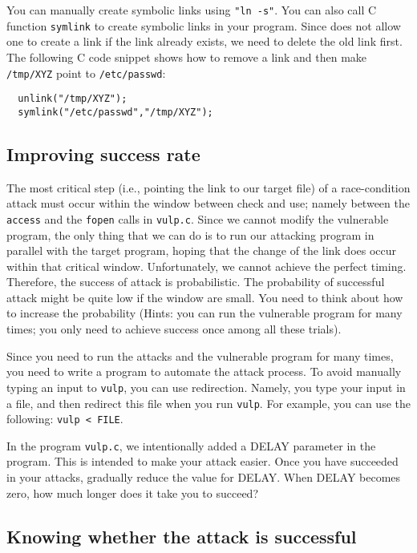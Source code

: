 You can manually create symbolic links using {\tt "ln -s"}. You can also call
C function {\tt symlink} to create symbolic links in your program. 
Since \linux does not allow one to create a link if the link already exists, 
we need to delete the old link first. 
The following C code snippet shows how to remove a link and then make 
{\tt /tmp/XYZ} point to {\tt /etc/passwd}:

\begin{verbatim}
  unlink("/tmp/XYZ");
  symlink("/etc/passwd","/tmp/XYZ");
\end{verbatim}


\subsection{Improving success rate}

The most critical step (i.e., pointing the link to our 
target file) of a race-condition attack must occur within
the window between check and use; namely between the {\tt access} and the {\tt fopen} 
calls in {\tt vulp.c}. Since we cannot modify the vulnerable program,
the only thing that we can do is to run our attacking program in parallel
with the target program, hoping that the change of the link does occur
within that critical window.
Unfortunately, we cannot achieve the perfect timing. Therefore, 
the success of attack is probabilistic.
The probability of successful attack might be quite low if the window
are small. You need to think about how to increase the 
probability (Hints: you can run the vulnerable program for many
times; you only need to achieve success once among all these trials).


Since you need to run the attacks and the vulnerable program for many
times, you need to write a program to automate the attack process. 
To avoid manually typing an input to {\tt vulp}, you can use 
redirection. Namely, you type your input in a file, and then
redirect this file when you run {\tt vulp}. For example,
you can use the following: {\tt vulp < FILE}.

In the program {\tt vulp.c}, we intentionally added a DELAY parameter
in the program. This is intended to make your attack easier. Once you have 
succeeded in your attacks, gradually reduce the value for DELAY. When DELAY becomes
zero, how much longer does it take you to succeed? 


\subsection{Knowing whether the attack is successful}

